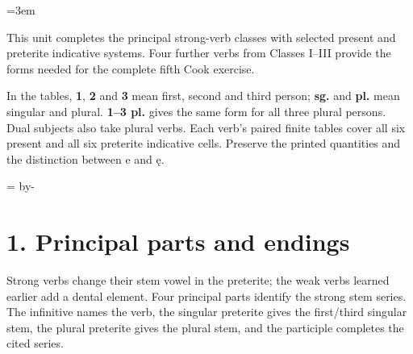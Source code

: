 \BookRecto
\begingroup
\renewcommand{\runningtitle}{Unit 5. Strong verbs IV–VII}
\emergencystretch=3em
\newcommand{\itempara}[2]{\par\addvspace{3pt}\noindent\hangindent=1.8em\hangafter=1\makebox[1.8em][l]{#1.}#2\par}
\newcommand{\reserve}[1]{\par\penalty-100\begingroup\dimen0=\pagegoal\advance\dimen0 by-\pagetotal\ifdim\dimen0<#1\newpage\fi\endgroup}

\raggedright
{}

This unit completes the principal strong-verb classes with selected present and preterite indicative systems. Four further verbs from Classes I–III provide the forms needed for the complete fifth Cook exercise.

In the tables, \textbf{1}, \textbf{2} and \textbf{3} mean first, second and third person; \textbf{sg.} and \textbf{pl.} mean singular and plural. \textbf{1–3 pl.} gives the same form for all three plural persons. Dual subjects also take plural verbs. Each verb’s paired finite tables cover all six present and all six preterite indicative cells. Preserve the printed quantities and the distinction between e and ę.

\reserve{7\baselineskip}
\section*{1. Principal parts and endings}

Strong verbs change their stem vowel in the preterite; the weak verbs learned earlier add a dental element. Four principal parts identify the strong stem series. The infinitive names the verb, the singular preterite gives the first/\allowbreak{}third singular stem, the plural preterite gives the plural stem, and the participle completes the cited series.


